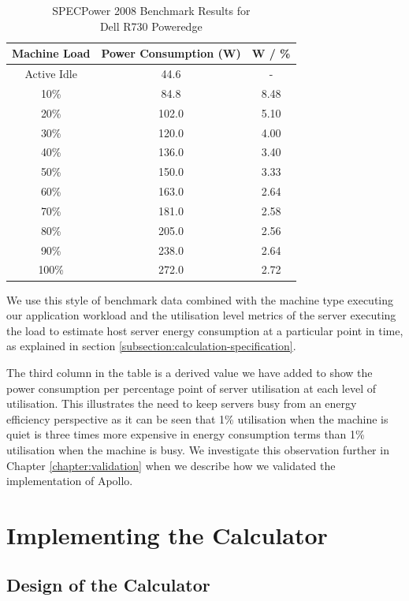 \begin{table}
\centering
\caption{SPECPower 2008 Benchmark Results for \\Dell R730 Poweredge}
\label{table:powervalues}
\footnotesize
\begin{tabular}{|c|c|c|}
\hline
Machine Load & Power Consumption (W) & W / \% \\
\hline
\hline
Active Idle  &  44.6 & -    \\
10\%         &  84.8 & 8.48 \\
20\%         & 102.0 & 5.10 \\
30\%         & 120.0 & 4.00 \\
40\%         & 136.0 & 3.40 \\
50\%         & 150.0 & 3.33 \\
60\%         & 163.0 & 2.64 \\
70\%         & 181.0 & 2.58 \\
80\%         & 205.0 & 2.56 \\
90\%         & 238.0 & 2.64 \\
100\%        & 272.0 & 2.72 \\
\hline
\end{tabular}
\end{table}

We use this style of benchmark data combined with the machine type executing our application workload and the utilisation level metrics of the server executing the load to estimate host server energy consumption at a particular point in time, as explained in section \ref{subsection:calculation-specification}.

The third column in the table is a derived value we have added to show the power consumption per percentage point of server utilisation at each level of utilisation.  This illustrates the need to keep servers busy from an energy efficiency perspective as it can be seen that 1\% utilisation when the machine is quiet is three times more expensive in energy consumption terms than 1\% utilisation when the machine is busy.  We investigate this observation further in Chapter \ref{chapter:validation} when we describe how we validated the implementation of Apollo.

\section{Implementing the Calculator}

\subsection{Design of the Calculator}

